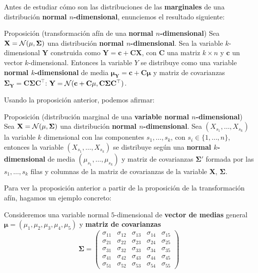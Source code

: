 \documentclass[]{book}
\begin{document}
Antes de estudiar cómo son las distribuciones de las \textbf{marginales} de una distribución \textbf{normal \(n\)-dimensional}, enunciemos el resultado siguiente:

Proposición (transformación afín de una \textbf{normal \(n\)-dimensional})
Sea \(\mathbf{X}={\cal N}(\mathbf{\mu},\mathbf{\Sigma})\) una distribución \textbf{normal \(n\)-dimensional}. Sea la variable \(k\)-dimensional \(\mathbf{Y}\) construida como \(\mathbf{Y}=\mathbf{c}+\mathbf{C}\mathbf{X}\), con \(\mathbf{C}\) una matriz \(k\times n\) y \(\mathbf{c}\) un vector \(k\)-dimensional. Entonces la variable \(Y\) se distribuye como una variable \textbf{normal \(k\)-dimensional} de media \(\mathbf{\mu}_{\mathbf{Y}}=\mathbf{c}+\mathbf{C}\mathbf{\mu}\) y matriz de covarianzas \(\mathbf{\Sigma}_{\mathbf{Y}}=\mathbf{C}\mathbf{\Sigma}\mathbf{C}^\top\): \(\mathbf{Y}={\cal N}(\mathbf{c}+\mathbf{C}\mathbf{\mu},\mathbf{C}\mathbf{\Sigma}\mathbf{C}^\top)\).

Usando la proposición anterior, podemos afirmar:

Proposición (distribución marginal de una \textbf{variable normal \(n\)-dimensional})
Sea \(\mathbf{X}={\cal N}(\mathbf{\mu},\mathbf{\Sigma})\) una distribución \textbf{normal \(n\)-dimensional}. Sea \((X_{s_1},\ldots,X_{s_k})\) la variable \(k\) dimensional con las componentes \(s_1,\ldots,s_k\), con \(s_i\in\{1,\ldots,n\}\), entonces la variable \((X_{s_1},\ldots,X_{s_k})\) se distribuye según una \textbf{normal \(k\)-dimensional} de media \((\mu_{s_1},\ldots,\mu_{s_k})\) y matriz de covarianzas \(\mathbf{\Sigma'}\) formada por las \(s_1,\ldots,s_k\) filas y columnas de la matriz de covarianzas de la variable \(\mathbf{X}\), \(\mathbf{\Sigma}\).

Para ver la proposición anterior a partir de la proposición de la transformación afín, hagamos un ejemplo concreto:

Consideremos una variable normal \(5\)-dimensional de \textbf{vector de medias} general \(\mathbf{\mu}=(\mu_1,\mu_2,\mu_3,\mu_4,\mu_5)\) y \textbf{matriz de covarianzas}
\[
\mathbf{\Sigma}=\begin{pmatrix}
\sigma_{11} & \sigma_{12} & \sigma_{13} & \sigma_{14} & \sigma_{15} \\
\sigma_{21} & \sigma_{22} & \sigma_{23} & \sigma_{24} & \sigma_{25} \\
\sigma_{31} & \sigma_{32} & \sigma_{33} & \sigma_{34} & \sigma_{35} \\
\sigma_{41} & \sigma_{42} & \sigma_{43} & \sigma_{44} & \sigma_{45} \\
\sigma_{51} & \sigma_{52} & \sigma_{53} & \sigma_{54} & \sigma_{55} 
\end{pmatrix}
\]
\end{document}
